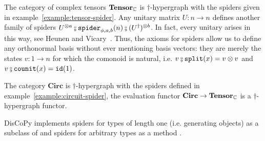 \begin{example}
The category of complex tensors $\mathbf{Tensor}_{\mathbb{C}}$ is $\dagger$-hypergraph with the spiders given in example~\ref{example:tensor-spider}.
Any unitary matrix $U : n \to n$ defines another family of spiders $U^{\otimes a} \fcmp \spider_{\phi, a, b}(n) \fcmp (U^\dagger)^{\otimes b}$.
In fact, every unitary arises in this way, see Heunen and Vicary~\cite[Corollary 5.32]{HeunenVicary19a}.
Thus, the axioms for spiders allow us to define any orthonormal basis without ever mentioning basis vectors: they are merely the states $v : 1 \to n$ for which the comonoid is natural, i.e. $v \fcmp \ttsplit(x) = v \otimes v$ and $v \fcmp \counit(x) = \id(1)$.
\end{example}

\begin{example}
The category $\mathbf{Circ}$ is $\dagger$-hypergraph with the spiders defined in example~\ref{example:circuit-spider}, the evaluation functor $\mathbf{Circ} \to \mathbf{Tensor}_{\mathbb{C}}$ is a $\dagger$-hypergraph functor.
\end{example}

DisCoPy implements spiders for types of length one (i.e. generating objects) as a subclass of  and spiders for arbitrary types as a method .

